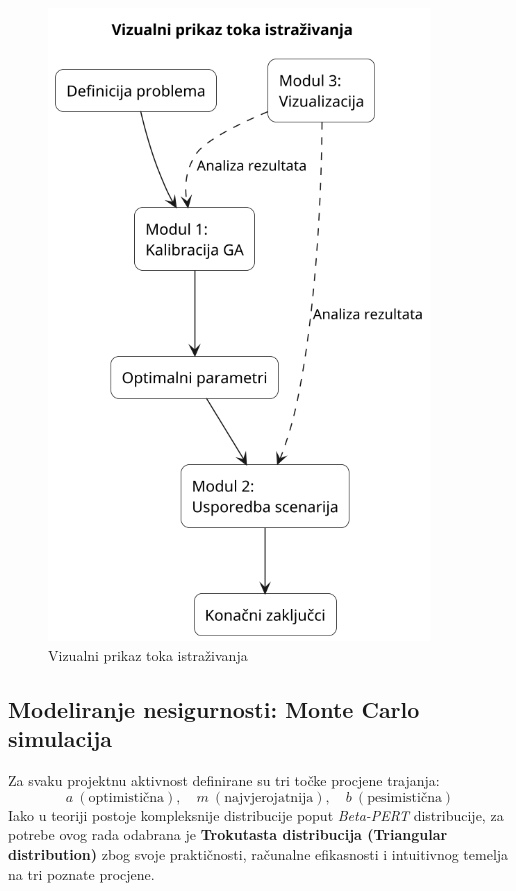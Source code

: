 \begin{figure}[H]
    \centering
    \includegraphics[width=0.9\textwidth]{slike/tijek_istrazivanja.png}
    \caption{Vizualni prikaz toka istraživanja}
    \label{fig:tok_istrazivanja}
\end{figure}

\subsection{Modeliranje nesigurnosti: Monte Carlo simulacija}

Za svaku projektnu aktivnost definirane su tri točke procjene trajanja:
\[
a \ (\text{optimistična}), \quad
m \ (\text{najvjerojatnija}), \quad
b \ (\text{pesimistična})
\]
Iako u teoriji postoje kompleksnije distribucije poput \textit{Beta-PERT} distribucije, 
za potrebe ovog rada odabrana je \textbf{Trokutasta distribucija (Triangular distribution)} 
zbog svoje praktičnosti, računalne efikasnosti i intuitivnog temelja na tri poznate procjene.

